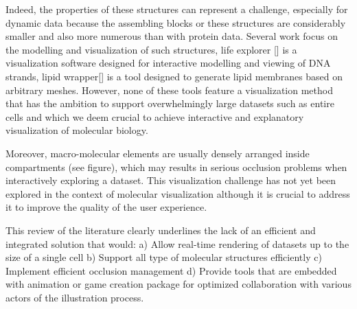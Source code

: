 Indeed, the properties of these structures can represent a challenge, especially for dynamic data because the assembling blocks or these structures are considerably smaller and also more numerous than with protein data.
Several work focus on the modelling and visualization of such structures, life explorer [] is a visualization software designed for interactive modelling and viewing of DNA strands, lipid wrapper[] is a tool designed to generate lipid membranes based on arbitrary meshes.
However, none of these tools feature a visualization method that has the ambition to support overwhelmingly large datasets such as entire cells and which we deem crucial to achieve interactive and explanatory visualization of molecular biology.

Moreover, macro-molecular elements are usually densely arranged inside compartments (see figure), which may results in serious occlusion problems when interactively exploring a dataset.
This visualization challenge has not yet been explored in the context of molecular visualization although it is crucial to address it to improve the quality of the user experience.

This review of the literature clearly underlines the lack of an efficient and integrated solution that would:
a) Allow real-time rendering of datasets up to the size of a single cell
b) Support all type of molecular structures efficiently
c) Implement efficient occlusion management
d) Provide tools that are embedded with animation or game creation package for optimized collaboration with various actors of the illustration process.


